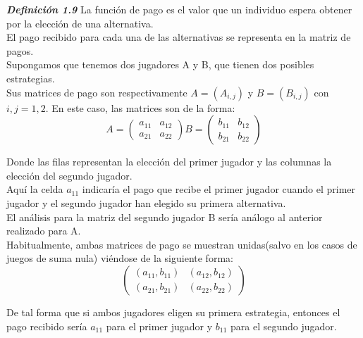 \documentclass[10pt,a4paper]{book}
\begin{document}
\textit{\textbf{Definición 1.9}} La función de pago es el valor que un individuo espera obtener por la elección de una alternativa.\\

El pago recibido para cada una de las alternativas se representa en la matriz de pagos.\\


Supongamos que tenemos dos jugadores A y B, que tienen dos posibles estrategias. \\
Sus matrices de pago son respectivamente $A=(A_{i,j})$ y $B=(B_{i,j})$ con $i,j=1,2$. En este caso, las matrices son de la forma:\\ 

\begin{equation}
	A= \begin{pmatrix}
		a_{11} & a_{12}\\
		a_{21} & a_{22}
	\end{pmatrix}
	B= \begin{pmatrix}
		b_{11} & b_{12}\\
		b_{21} & b_{22}
	\end{pmatrix}
\end{equation} 



Donde las filas representan la elección del primer jugador y las columnas la elección del segundo jugador.\\
Aquí la celda $a_{11}$ indicaría el pago que recibe el primer jugador cuando el primer jugador y el segundo jugador han elegido su primera alternativa.\\

El análisis para la matriz del segundo jugador B sería análogo al anterior realizado para A.\\

Habitualmente, ambas matrices de pago se muestran unidas(salvo en los casos de juegos de suma nula) viéndose de la siguiente forma:\\

\begin{equation}
	\begin{pmatrix}
		(a_{11},b_{11}) & (a_{12}, b_{12})\\
		(a_{21},b_{21}) & (a_{22},b_{22})
	\end{pmatrix}	
\end{equation} 

De tal forma que si ambos jugadores eligen su primera estrategia, entonces el pago recibido sería $a_{11}$ para el primer jugador y $b_{11}$ para el segundo jugador.\\
\end{document}
